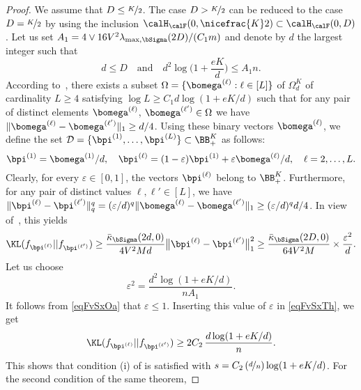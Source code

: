 \begin{proof}
We assume that $D \leq \nicefrac{K}2$. The case $D> \nicefrac{K}2$ can be reduced to the
case $D = \nicefrac{K}2$ by using the inclusion $\calH_\calF(0,\nicefrac{K}2)\subset \calH_\calF(0,D)$. Let us set $A_1 = 4\vee {16 V^2\lambda_{\max,\bSigma}(2D)}/{(C_1 m)}$ 
and denote by $d$ the largest integer such that
\begin{equation}\label{eqFvSxOa}
d\le D\quad\text{and}\quad d^2\log\Big(1+\frac{e  K}{d}\Big)\le A_1 n.
\end{equation}
According to~, there exists a subset
$\Omega = \{\bomega^{(\ell)}:\ell\in[L]\}$ of  $\Omega_{d}^{K}$ of cardinality $L\ge 4$
satisfying $\log L\geq {C_1 d}\log(1+{eK}/{d})$ such that for any pair of distinct 
elements $\bomega^{(\ell)}$, $\bomega^{(\ell')}\in \Omega$ we have
$\|\bomega^{(\ell)}-\bomega^{(\ell')}\|_1 \geq d/4$. Using these binary vectors $\bomega^{(\ell)}$, we define the set $\mathcal{D} =
\{ \bpi^{(1)},\dots,\bpi^{(L)}\}\subset \BB_+^{K}$ as follows:
\begin{equation}\label{eqFvSxTw}
\bpi^{(1)}=\bomega^{(1)}/d,\quad
\bpi^{(\ell)}=(1-\varepsilon)\bpi^{(1)}+\varepsilon \bomega^{(\ell)}/d,\quad \ell=2,\ldots,L.
\end{equation}
Clearly, for every $\varepsilon\in[0,1]$, the vectors $\bpi^{(\ell)}$ belong to  $\BB^K_+$.
Furthermore, for any pair of distinct
values $\ell,\ell'\in[L]$, we have $\|\bpi^{(\ell)}-\bpi^{(\ell')}\|_q^q = (\varepsilon/d)^q
\|\bomega^{(\ell)}-\bomega^{(\ell')}\|_1\ge (\varepsilon/d)^qd/4$.  In view of~,
this yields
\begin{equation}\label{eqFvSxTh}
\KL(f_{\bpi^{(\ell)}}||f_{\bpi^{(\ell')}})
    \geq \frac{\bar\kappa_{\bSigma}(2d,0)}{4V^2M d} \big{\|}\bpi^{(\ell)} - \bpi^{(\ell')}\big{\|}_1^2
    \geq \frac{\bar\kappa_{\bSigma}(2D,0)}{64V^2M}\times\frac{\varepsilon^2}{d}.
\end{equation}
Let us choose
\begin{equation}
\varepsilon^2 = \frac{d^2 \log(1+e  K/d)}{n A_1}.
\end{equation}
It follows from \eqref{eqFvSxOa} that $\varepsilon\le 1$. Inserting this value of
$\varepsilon$ in \eqref{eqFvSxTh}, we get
\begin{equation}
\KL(f_{\bpi^{(\ell)}}||f_{\bpi^{(\ell')}}) \geq 2 C_2\,\frac{d\log(1+e  K/d)}{n}.
\end{equation}
This shows that condition (i) of  is satisfied with
$s= C_2\,(\nicefrac{d}{n})\log(1+e  K/d)$.  For the second condition of the same theorem, 

\end{proof}

